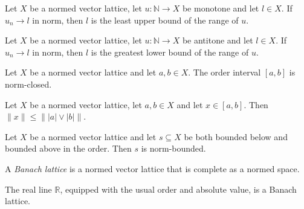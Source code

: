 \begin{theorem}
\label{thm:isLUB-of-monotone-tendsto}
\leanok
{}
Let $X$ be a normed vector lattice, let $u : \mathbb{N} \to X$ be
monotone and let $l \in X$. If $u_n \to l$ in norm, then $l$ is the
least upper bound of the range of $u$.
\end{theorem}

\begin{theorem}
\label{thm:isGLB-of-antitone-tendsto}
\leanok
{}
Let $X$ be a normed vector lattice, let $u : \mathbb{N} \to X$ be
antitone and let $l \in X$. If $u_n \to l$ in norm, then $l$ is the
greatest lower bound of the range of $u$.
\end{theorem}

\begin{lemma}
\label{lem:isClosed-interval}
\leanok
{}
Let $X$ be a normed vector lattice and let $a, b \in X$. The order
interval $[a, b]$ is norm-closed.
\end{lemma}

\begin{lemma}
\label{lem:norm-le-norm-abs-sup-abs-of-mem-Icc}
\leanok
{}
Let $X$ be a normed vector lattice, let $a, b \in X$ and let
$x \in [a, b]$. Then $\lVert x \rVert \le \lVert \lvert a \rvert \vee
\lvert b \rvert \rVert$.
\end{lemma}

\begin{theorem}
\label{thm:isBounded-of-bddBelow-bddAbove}
\leanok
{}
Let $X$ be a normed vector lattice and let $s \subseteq X$ be both
bounded below and bounded above in the order. Then $s$ is norm-bounded.
\end{theorem}

\begin{definition}
\label{def:banach-lattice}
\leanok
{}
A \emph{Banach lattice} is a normed vector lattice that is complete
as a normed space.
\end{definition}

\begin{lemma}
\label{lem:real-banachLattice}
\leanok
{}
The real line $\mathbb{R}$, equipped with the usual order and absolute
value, is a Banach lattice.
\end{lemma}

